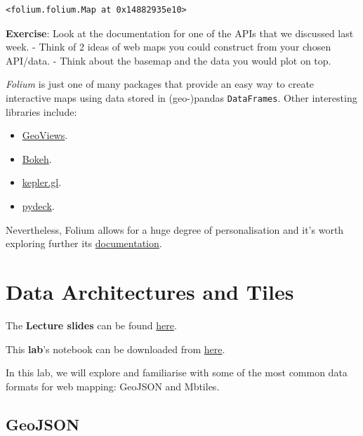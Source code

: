 \documentclass[
  letterpaper,
  DIV=11,
  numbers=noendperiod]{scrreprt}
\providecommand{\tightlist}{%
  \setlength{\itemsep}{0pt}\setlength{\parskip}{0pt}}\usepackage{longtable,booktabs,array}
\begin{document}
\begin{verbatim}
<folium.folium.Map at 0x14882935e10>
\end{verbatim}

\textbf{Exercise}: Look at the documentation for one of the APIs that we
discussed last week. - Think of 2 ideas of web maps you could construct
from your chosen API/data. - Think about the basemap and the data you
would plot on top.

\emph{Folium} is just one of many packages that provide an easy way to
create interactive maps using data stored in (geo-)pandas
\texttt{DataFrames}. Other interesting libraries include:

\begin{itemize}
\tightlist
\item
  \href{https://geoviews.org/}{GeoViews}.
\item
  \href{https://docs.bokeh.org/en/latest/docs/gallery.html}{Bokeh}.
\item
  \href{https://docs.kepler.gl/docs/keplergl-jupyter}{kepler.gl}.
\item
  \href{https://deckgl.readthedocs.io/en/latest/}{pydeck}.
\end{itemize}

Nevertheless, Folium allows for a huge degree of personalisation and
it's worth exploring further its
\href{https://python-visualization.github.io/folium/latest/reference.html}{documentation}.


\hypertarget{data-architectures-and-tiles}{%
\chapter{Data Architectures and
Tiles}\label{data-architectures-and-tiles}}

The \textbf{Lecture slides} can be found
\href{https://github.com/GDSL-UL/wma/raw/main/lectures/w05.pdf}{here}.

This \textbf{lab}'s notebook can be downloaded from
\href{https://github.com/GDSL-UL/wma/blob/main/labs/w05_dataArch.ipynb}{here}.

In this lab, we will explore and familiarise with some of the most
common data formats for web mapping: GeoJSON and Mbtiles.

\hypertarget{geojson}{%
\section{GeoJSON}\label{geojson}}
\end{document}
